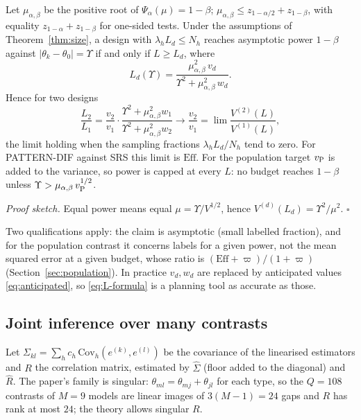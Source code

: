 \begin{corollary}\label{cor:are}
Let $\mu_{\alpha,\beta}$ be the positive root of $\Psi_\alpha(\mu)=1-\beta$; $\mu_{\alpha,\beta}\le z_{1-\alpha/2}+z_{1-\beta}$, with equality $z_{1-\alpha}+z_{1-\beta}$ for one-sided tests. Under the assumptions of Theorem~\ref{thm:size}, a design with $\lambda_hL_d\le N_h$ reaches asymptotic power $1-\beta$ against $|\theta_k-\theta_0|=\Upsilon$ if and only if $L\ge L_d$, where
\begin{equation}\label{eq:L-formula}
L_d(\Upsilon)=\frac{\mu_{\alpha,\beta}^2\,v_d}{\Upsilon^2+\mu_{\alpha,\beta}^2\,w_d}.
\end{equation}
Hence for two designs
\begin{equation}\label{eq:are}
\frac{L_2}{L_1}=\frac{v_2}{v_1}\cdot\frac{\Upsilon^2+\mu^2_{\alpha,\beta}w_1}{\Upsilon^2+\mu^2_{\alpha,\beta}w_2}\longrightarrow\frac{v_2}{v_1}=\lim\frac{V^{(2)}(L)}{V^{(1)}(L)},
\end{equation}
the limit holding when the sampling fractions $\lambda_hL_d/N_h$ tend to zero. For PATTERN-DIF against SRS this limit is $\mathrm{Eff}$. For the population target $v_{\rm P}$ is added to the variance, so power is capped at every $L$: no budget reaches $1-\beta$ unless $\Upsilon>\mu_{\alpha,\beta}\,v_{\rm P}^{1/2}$.
\end{corollary}

\emph{Proof sketch.} Equal power means equal $\mu=\Upsilon/V^{1/2}$, hence $V^{(d)}(L_d)=\Upsilon^2/\mu^2$. $\square$

Two qualifications apply: the claim is asymptotic (small labelled fraction), and for the population contrast it concerns labels for a given power, not the mean squared error at a given budget, whose ratio is $(\mathrm{Eff}+\varpi)/(1+\varpi)$ (Section~\ref{sec:population}). In practice $v_d,w_d$ are replaced by anticipated values \eqref{eq:anticipated}, so \eqref{eq:L-formula} is a planning tool as accurate as those.

\subsection{Joint inference over many contrasts}\label{sec:test-joint}

Let $\Sigma_{kl}=\sum_hc_h\,\mathrm{Cov}_h(e^{(k)},e^{(l)})$ be the covariance of the linearised estimators and $R$ the correlation matrix, estimated by $\hat\Sigma$ (floor added to the diagonal) and $\hat R$. The paper's family is singular: $\theta_{ml}=\theta_{mj}+\theta_{jl}$ for each type, so the $Q=108$ contrasts of $M=9$ models are linear images of $3(M-1)=24$ gaps and $R$ has rank at most $24$; the theory allows singular $R$.

